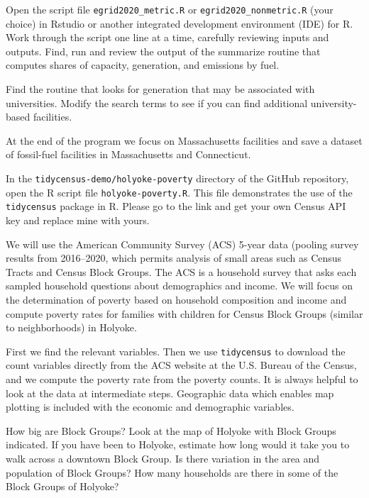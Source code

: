 \documentclass[fleqn, 12pt]{exam}
\begin{document}
\begin{questions}
  \question  Open the script file \texttt{egrid2020\_metric.R} or \texttt{egrid2020\_nonmetric.R} (your choice) in Rstudio or another integrated development environment (IDE) for R.  Work through the script one line at a time, carefully reviewing inputs and outputs.   Find, run and review the output of the summarize routine that computes shares of capacity, generation, and emissions by fuel. 

  \question Find the routine that looks for generation that may be associated with universities. Modify the search terms to see if you can find additional university-based facilities.
    
  \question At the end of the program we focus on Massachusetts facilities and save a dataset of fossil-fuel facilities in Massachusetts and Connecticut.
    
  \question In the \texttt{tidycensus-demo/holyoke-poverty} directory of the GitHub repository, open the R script file \texttt{holyoke-poverty.R}.  This file demonstrates the use of the \texttt{tidycensus} package in R.  Please go to the link and get your own Census API key and replace mine with yours.

  \question We will use the American Community Survey (ACS) 5-year data (pooling survey results from 2016--2020, which permits analysis of small areas such as Census Tracts and Census Block Groups.  The ACS is a household survey that asks each sampled household questions about demographics and income.  We will focus on the determination of poverty based on household composition and income and compute poverty rates for families with children for Census Block Groups (similar to neighborhoods) in Holyoke.

  \question First we find the relevant variables.  Then we use \texttt{tidycensus} to download the count variables directly from the ACS website at the U.S. Bureau of the Census, and we compute the poverty rate from the poverty counts. It is always helpful to look at the data at intermediate steps.  Geographic data which enables map plotting is included with the economic and demographic variables. 

  \question How big are Block Groups?  Look at the map of Holyoke with Block Groups indicated.  If you have been to Holyoke, estimate how long would it take you to walk across a downtown Block Group.  Is there variation in the area and population of Block Groups?  How many households are there in some of the Block Groups of Holyoke?
    

\end{questions}
\end{document}
